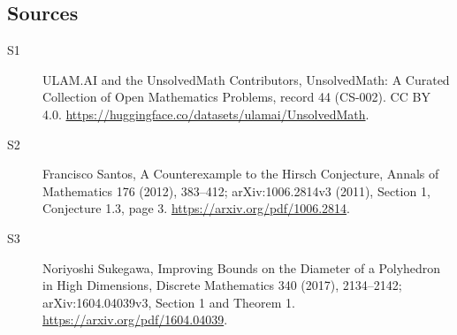 \documentclass[11pt]{article}
\begin{document}
\subsection{Sources}
\begin{description}
\item[\hypertarget{source:44:1}{S1}] ULAM.AI and the UnsolvedMath Contributors, UnsolvedMath: A Curated Collection of Open Mathematics Problems, record 44 (CS-002). CC BY 4.0. \url{https://huggingface.co/datasets/ulamai/UnsolvedMath}.
\item[\hypertarget{source:44:2}{S2}] Francisco Santos, A Counterexample to the Hirsch Conjecture, Annals of Mathematics 176 (2012), 383--412; arXiv:1006.2814v3 (2011), Section 1, Conjecture 1.3, page 3. \url{https://arxiv.org/pdf/1006.2814}.
\item[\hypertarget{source:44:3}{S3}] Noriyoshi Sukegawa, Improving Bounds on the Diameter of a Polyhedron in High Dimensions, Discrete Mathematics 340 (2017), 2134--2142; arXiv:1604.04039v3, Section 1 and Theorem 1. \url{https://arxiv.org/pdf/1604.04039}.
\end{description}
\label{end:44}
\end{document}
